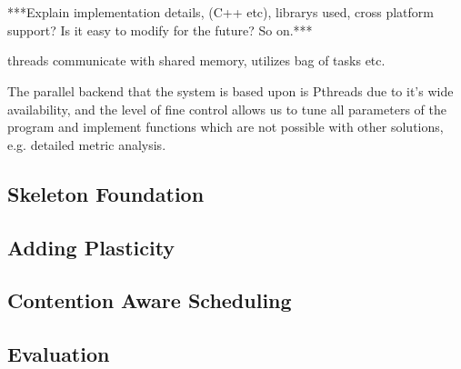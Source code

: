 \section{}

***Explain implementation details, (C++ etc), librarys used, cross platform support? Is it easy to modify for the future? So on.***

threads communicate with shared memory, utilizes bag of tasks etc.

The parallel backend that the system is based upon is Pthreads due to it's wide availability, and the level of fine control allows us to tune all parameters of the program and implement functions which are not possible with other solutions, e.g. detailed metric analysis. 

\subsection{Skeleton Foundation}
\subsection{Adding Plasticity}
\subsection{Contention Aware Scheduling}
\subsection{Evaluation}